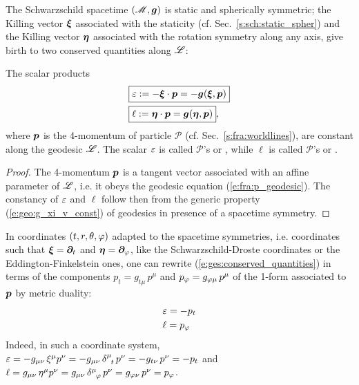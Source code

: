 The Schwarzschild spacetime $(\mathscr{M},\bm{g})$ is static and spherically symmetric; the
Killing vector $\bm{\xi}$ associated with the staticity (cf. Sec.~\ref{s:sch:static_spher})
and the Killing vector $\bm{\eta}$ associated with the rotation symmetry along any
axis, give birth to two conserved quantities along $\mathscr{L}$:
\begin{greybox}
The scalar products
\begin{subequations}
\label{e:ges:conserved_quantities}
\begin{align}
& \fbox{$\displaystyle \varepsilon := - \bm{\xi}\cdot \bm{p} = - \bm{g}(\bm{\xi},\bm{p}) $} \label{e:ges:conserved_energy} \\
& \fbox{$\displaystyle \ell := \bm{\eta}\cdot \bm{p} = \bm{g}(\bm{\eta},\bm{p}) $} , \label{e:ges:conserved_angu_mom}
\end{align}
\end{subequations}
where $\bm{p}$ is the 4-momentum of particle
$\mathscr{P}$ (cf. Sec.~\ref{s:fra:worldlines}),
are constant along the geodesic $\mathscr{L}$.
The scalar $\varepsilon$ is called $\mathscr{P}$'s
or ,
while $\ell$ is called $\mathscr{P}$'s 
or .
\end{greybox}
\begin{proof}
The 4-momentum $\bm{p}$ is a tangent vector associated with an affine parameter
of $\mathscr{L}$, i.e. it obeys the geodesic equation (\ref{e:fra:p_geodesic}).
The constancy of $\varepsilon$ and $\ell$ follow then from the generic property (\ref{e:geo:g_xi_v_const})
of geodesics in presence of a spacetime symmetry.
\end{proof}
In coordinates $(t,r,\theta,\varphi)$ adapted to the spacetime symmetries,
i.e. coordinates such that $\bm{\xi} = \bm{\partial}_t$ and $\bm{\eta}=\bm{\partial}_\varphi$, like the Schwarzschild-Droste
coordinates or the Eddington-Finkelstein ones, one can rewrite
(\ref{e:ges:conserved_quantities})
in terms of the components $p_t = g_{t\mu} \, p^\mu$ and $p_\varphi = g_{\varphi\mu} \, p^\mu$
of the 1-form associated to $\bm{p}$ by metric duality:
\begin{subequations}
\begin{align}
& \varepsilon = - p_t \\
& \ell = p_\varphi
\end{align}
\end{subequations}
Indeed, in such a coordinate system, $\varepsilon = -g_{\mu\nu} \, \xi^\mu p^\nu = -g_{\mu\nu}\,  \delta^\mu_{\ \, t} \, p^\nu = -g_{t\nu} \, p^\nu = -p_t$
and $\ell = g_{\mu\nu} \, \eta^\mu p^\nu = g_{\mu\nu}\,  \delta^\mu_{\ \, \varphi} \, p^\nu = g_{\varphi\nu} \, p^\nu = p_\varphi$.


